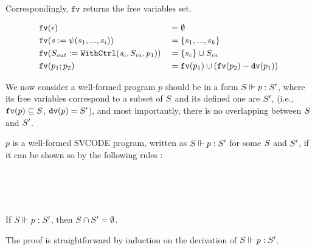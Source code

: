 Correspondingly, $\texttt{fv}$ returns the free variables set.

\begin{alignat*}{2}
&\FV{\epsilon} && = \emptyset \\
&\FV{\sdef{\s}{\psi(s_1,...,s_i)}} && = \{s_1,...,s_k\}\\
&\FV{\withctrl{\s_c}{p_1}{\Sin}{\Sout}} && = \{s_c\} \cup \Sin \\
&\FV{p_1;p_2} && = \FV{p_1} \cup (\FV{p_2} - \dv{p_1}) \\
\end{alignat*}

We now consider a well-formed program $p$ should be in a form $\wf{p}{S}{S'}$, where its free variables correspond to a subset of $\S$ and its defined one are $\S'$, (i.e., $\FV{p} \subseteq \S$, $\dv{p} = \S'$), and most importantly, there is no overlapping between $\S$ and $\S'$.
\begin{defi}
	$p$ is a well-formed SVCODE program, written as $\wf{p}{S}{S'}$ for some $\S$ and $\S'$,  if it can be shown so by the following rules :
\end{defi}
	
    \\[3ex]
   	
   	\\[3ex]
   
   \\[3ex]

\begin{lem}
	If $\wf{p}{\S}{\S'}$, then  $\S \cap \S' = \emptyset $. 
\end{lem}

The proof is straightforward by induction on the derivation of $\wf{p}{S}{S'}$.



